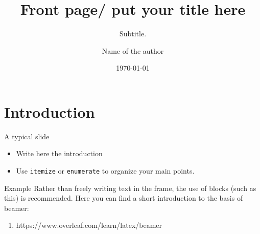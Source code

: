 \documentclass[aspectratio=169]{beamer}
\title[Your Short Title]{Front page/ put your title here}
\subtitle{Subtitle.}
\author{Name of the author}
\date{\today}
\begin{document}
	\maketitle
	\tableofcontents

	\section{Introduction}
	\begin{frame}{A typical slide}
		\begin{itemize}
			\item Write here the introduction
			\item Use \texttt{itemize} or \texttt{enumerate} to organize your main points.
		\end{itemize}
		\begin{block}{Example}
			Rather than freely writing text in the frame, the use of blocks (such as this) is recommended.
			Here you can find a short introduction to the basis of beamer:
			\begin{enumerate}
				\item https://www.overleaf.com/learn/latex/beamer
			\end{enumerate}
		\end{block}
	\end{frame}
\end{document}

